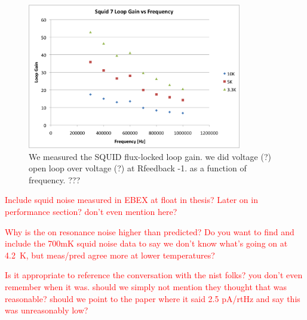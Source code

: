 \begin{figure}[ht!]
\begin{center}
\includegraphics[height=2.5in]{figures/squid7_loopgain.png}
\caption{We measured the \ac{SQUID} flux-locked loop gain. we did voltage (?) open loop over voltage (?) at Rfeedback -1. as a function of frequency. ???
\label{fig:squid_flux_locked_loopgain} }
\end{center}
\end{figure}

\textcolor{red}{Include squid noise measured in EBEX at float in thesis? Later on in performance section? don't even mention here?}

\textcolor{red}{Why is the on resonance noise higher than predicted? Do you want to find and include the 700mK squid noise data to say we don't know what's going on at 4.2~K, but meas/pred agree more at lower temperatures?}

\textcolor{red}{Is it appropriate to reference the conversation with the nist folks? you don't even remember when it was. should we simply not mention they thought that was reasonable? should we point to the paper where it said 2.5 pA/rtHz and say this was unreasonably low?}

